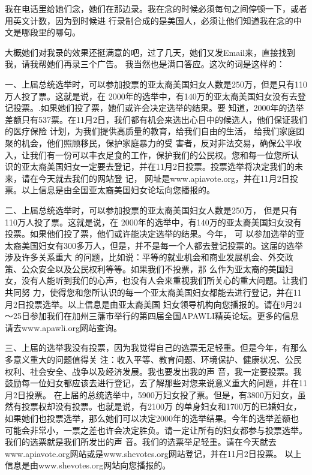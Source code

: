﻿\documentclass[11pt]{article}
\begin{document}
我在电话里给她们念，她们在那边录。我在念的时候必须每句之间停顿一下，或者用英文计数，因为到时候进
行录制合成的是美国人，必须让他们知道我在念的中文是哪段里的哪句。

大概她们对我录的效果还挺满意的吧，过了几天，她们又发Email来，直接找到我，请我帮她们再录三个广告。
我当然也是满口答应。这次的词是这样的：

一、上届总统选举时，可以参加投票的亚太裔美国妇女人数是250万，但是只有110万人投了票。这就是说，在
2000年的选举中，有140万的亚太裔美国妇女没有去登记投票。.如果她们投了票，她们或许会决定选举的结果。要
知道，2000年的选举差额只有537票。在11月2日，我们都有机会来选出心目中的候选人，他们保证我们的医疗保险
计划，为我们提供高质量的教育，给我们自由的生活， 给我们家庭团聚的机会，他们照顾移民，保护家庭暴力的受
害者，反对非法交易，确保公平收入，让我们有一份可以丰衣足食的工作，保护我们的公民权。您和每一位您所认
识的亚太裔美国妇女一定要去登记，并在11月2日投票。投票选举将决定我们的未来，请在今天就去我们的网站登
记， 网址是www.apiavote.org，并在11月2日投票。以上信息是由全国亚太裔美国妇女论坛向您播报的。

二、上届总统选举时，可以参加投票的亚太裔美国妇女人数是250万， 但是只有110万人投了票。这就是说，在
2000年的选举中，有140万的亚太裔美国妇女没有投票。如果他们投了票，他们或许能决定选举的结果。今年， 可
以参加选举的亚太裔美国妇女有300多万人，但是，并不是每一个人都去登记投票的。这届的选举涉及许多关系重大
的问题，比如说：平等的就业机会和商业发展机会、外交政策、公众安全以及公民权利等等。如果我们不投票，那
么作为亚太裔的美国妇女，没有人能听到我们的心声，也没有人会来重视我们所关心的重大问题。让我们共同努
力，使得您和您所认识的每一个亚太裔美国妇女都能去进行登记，并在11月2日投票选举。以上信息是由亚太裔美国
妇女领导机构向您播报的。请在9月24～25日参加我们在加州三藩市举行的第四届全国APAWLI精英论坛。更多的信息
请去www.apawli.org网站查询。

三、上届的选举我没有投票，因为我觉得自己的选票无足轻重。但是今年，有那么多意义重大的问题值得关
注：收入平等、教育问题、环境保护、健康状况、公民权利、社会安全、战争以及经济发展。我也要发出我的声
音，我一定要投票。我鼓励每一位妇女都应该去进行登记，去了解那些对您来说意义重大的问题，并在11月2日投票。
在上届的总统选举中，5900万妇女投了票。但是，有3800万妇女，虽然有投票权却没有投票。也就是说，有2100万
的单身妇女和1700万的已婚妇女，如果她们也投票选举，那么她们可以决定2000年的选举结果。今年的选举差额也
可能会非常小，一票之差也许会决定胜负。请一定让所有的妇女都参与投票选举。我们的选票就是我们所发出的声
音。我们的选票举足轻重。请在今天就去www.apiavote.org网站或是www.shevotes.org网站登记，并在11月2日投票。
以上信息是由www.shevotes.org网站向您播报的。
\end{document}
